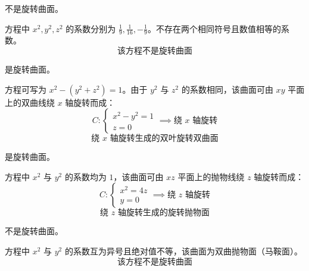 \begin{solution}
     不是旋转曲面。

    方程中 $x^2, y^2, z^2$ 的系数分别为 $\frac{1}{9}, \frac{1}{16}, -\frac{1}{9}$。不存在两个相同符号且数值相等的系数。
    \begin{equation*}
        \boxed{\text{该方程不是旋转曲面}}
    \end{equation*}

     是旋转曲面。

    方程可写为 $x^2 - (y^2 + z^2) = 1$。由于 $y^2$ 与 $z^2$ 的系数相同，该曲面可由 $xy$ 平面上的双曲线绕 $x$ 轴旋转而成：
    \begin{equation*}
        C: \begin{cases} x^2 - y^2 = 1 \\ z = 0 \end{cases} \implies \text{绕 } x \text{ 轴旋转}
    \end{equation*}
    \begin{equation*}
        \boxed{\text{绕 } x \text{ 轴旋转生成的双叶旋转双曲面}}
    \end{equation*}

     是旋转曲面。

    方程中 $x^2$ 与 $y^2$ 的系数均为 $1$，该曲面可由 $xz$ 平面上的抛物线绕 $z$ 轴旋转而成：
    \begin{equation*}
        C: \begin{cases} x^2 = 4z \\ y = 0 \end{cases} \implies \text{绕 } z \text{ 轴旋转}
    \end{equation*}
    \begin{equation*}
        \boxed{\text{绕 } z \text{ 轴旋转生成的旋转抛物面}}
    \end{equation*}

     不是旋转曲面。

    方程中 $x^2$ 与 $y^2$ 的系数互为异号且绝对值不等，该曲面为双曲抛物面（马鞍面）。
    \begin{equation*}
        \boxed{\text{该方程不是旋转曲面}}
    \end{equation*}
\end{solution}


